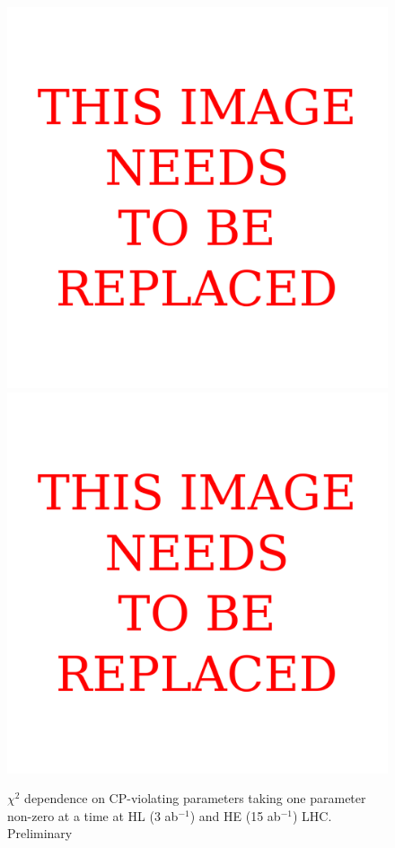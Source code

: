 \begin{figure}[h!]
\centering
 \includegraphics[scale=0.6]{section2/plots/tCza-Chisq-HL3ab-HE15ab}
\includegraphics[scale=0.6]{section2/plots/tCzz-Chisq-HL3ab-HE15ab}
\caption{$\chi^2$ dependence on CP-violating parameters taking one parameter non-zero at a time 
at HL (3 ab$^{-1}$) and HE (15 ab$^{-1}$) LHC. {\cred Preliminary} }\label{fig:fit1p}
\end{figure}

